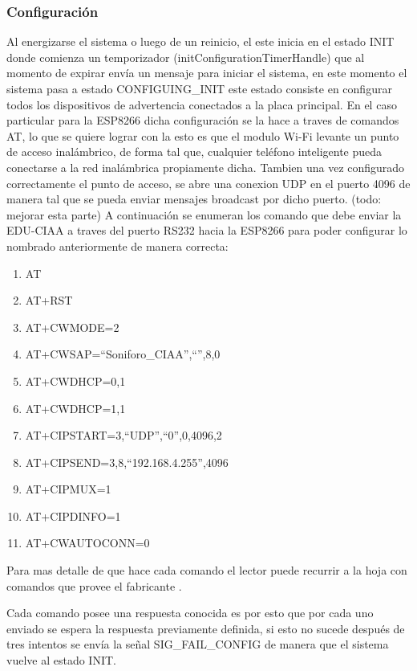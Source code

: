 \subsubsection{Configuración}
Al energizarse el sistema o luego de un reinicio, el este inicia en el estado INIT donde comienza un temporizador (initConfigurationTimerHandle) que al momento de expirar envía un mensaje para iniciar el sistema, en este momento el sistema pasa a estado CONFIGUING\_INIT este estado consiste en configurar todos los dispositivos de advertencia conectados a la placa principal. 
En el caso particular para la ESP8266 dicha configuración se la hace a traves de comandos AT, lo que se quiere lograr con la esto es que el modulo Wi-Fi levante un punto de acceso inalámbrico, de forma tal que, cualquier teléfono inteligente pueda conectarse a la red inalámbrica propiamente dicha. Tambien una vez configurado correctamente el punto de acceso, se abre una conexion UDP en el puerto 4096 de manera tal que se pueda enviar mensajes broadcast por dicho puerto. (todo: mejorar esta parte)
A continuación se enumeran los comando que debe enviar la EDU-CIAA a traves del puerto RS232 hacia la ESP8266 para poder configurar lo nombrado anteriormente de manera correcta:

\begin{enumerate}
\item{AT}
\item{AT+RST}
\item{AT+CWMODE=2}
\item{AT+CWSAP=``Soniforo\_CIAA'',``'',8,0}
\item{AT+CWDHCP=0,1}
\item{AT+CWDHCP=1,1}
\item{AT+CIPSTART=3,``UDP'',``0'',0,4096,2}
\item{AT+CIPSEND=3,8,``192.168.4.255'',4096}
\item{AT+CIPMUX=1}
\item{AT+CIPDINFO=1}
\item{AT+CWAUTOCONN=0}
\end{enumerate}

Para mas detalle de que hace cada comando el lector puede recurrir a la hoja con comandos que provee el fabricante \citep{esp8266command}.

Cada comando posee una respuesta conocida es por esto que por cada uno enviado se espera la respuesta previamente definida, si esto no sucede después de tres intentos se envía la señal SIG\_FAIL\_CONFIG de manera que el sistema vuelve al estado INIT.

